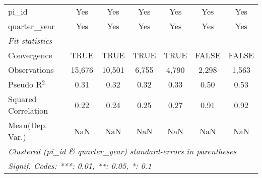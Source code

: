 \begin{tabular}{lcccccc}
   pi\_id                                                     & Yes          & Yes           & Yes           & Yes           & Yes           & Yes\\  
   quarter\_year                                              & Yes          & Yes           & Yes           & Yes           & Yes           & Yes\\  
   \midrule
   \emph{Fit statistics}\\
   Convergence                                                &TRUE          & TRUE          & TRUE          & TRUE          & FALSE         & FALSE\\  
   Observations                                               & 15,676       & 10,501        & 6,755         & 4,790         & 2,298         & 1,563\\  
   Pseudo R$^2$                                               & 0.31         & 0.32          & 0.32          & 0.33          & 0.50          & 0.53\\  
   Squared Correlation                                        & 0.22         & 0.24          & 0.25          & 0.27          & 0.91          & 0.92\\  
Mean(Dep. Var.) & NaN & NaN & NaN & NaN & NaN & NaN \\
   \midrule \midrule
   \multicolumn{7}{l}{\emph{Clustered (pi\_id \& quarter\_year) standard-errors in parentheses}}\\
   \multicolumn{7}{l}{\emph{Signif. Codes: ***: 0.01, **: 0.05, *: 0.1}}\\
\end{tabular}
\par\endgroup
